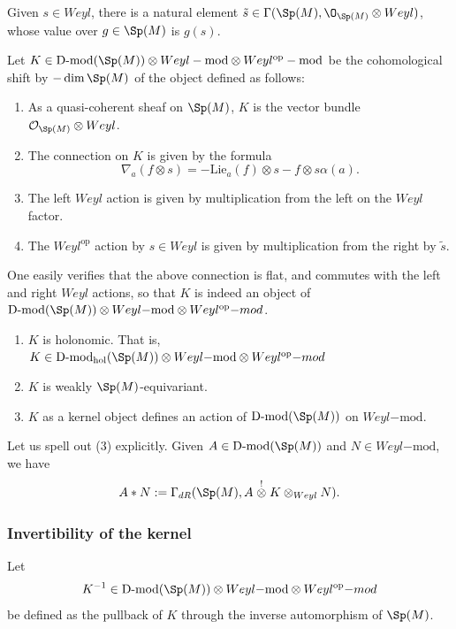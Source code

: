\documentclass[11pt]{article}
\begin{document}
Given $s\in Weyl$, there is a natural element $\tilde{s}\in \Gamma(\Sp(M), \O_{\Sp(M)}\otimes Weyl)$, whose value over $g\in \Sp(M)$ is $g(s)$.
\begin{definition}
    Let $K\in \operatorname{D-mod}(\Sp(M))\otimes Weyl-\mathrm{mod}\otimes Weyl^{\mathrm{op}}-\mathrm{mod}$ be the cohomological shift by $-\dim \Sp(M)$ of the object defined as follows:
    \begin{enumerate}
        \item As a quasi-coherent sheaf on $\Sp(M)$, $K$ is the vector bundle $\mathcal{O}_{\Sp(M)}\otimes Weyl$.
        \item The connection on $K$ is given by the formula $$\nabla_a(f\otimes s) = -\mathrm{Lie}_a(f)\otimes s - f\otimes s\alpha(a).$$
        \item The left $Weyl$ action is given by multiplication from the left on the $Weyl$ factor.
        \item The $Weyl^{\mathrm{op}}$ action by $s\in Weyl$ is given by multiplication from the right by $\tilde{s}$.
    \end{enumerate}
    One easily verifies that the above connection is flat, and commutes with the left and right $Weyl$ actions, so that $K$ is indeed an object of $\operatorname{D-mod}(\Sp(M))\otimes Weyl\mathrm{-mod}\otimes Weyl^{\mathrm{op}}{-mod}$.
\end{definition}
\begin{proposition}
    \begin{enumerate}
        \item $K$ is holonomic. That is, $K\in \operatorname{D-mod}_{\mathrm{hol}}(\Sp(M))\otimes Weyl\mathrm{-mod}\otimes Weyl^{\mathrm{op}}{-mod}$
        \item $K$ is weakly $\Sp(M)$-equivariant.
        \item $K$ as a kernel object defines an action of $\operatorname{D-mod}(\Sp(M))$ on $Weyl\mathrm{-mod}$.
    \end{enumerate}
\end{proposition}
Let us spell out (3) explicitly. Given $A\in \operatorname{D-mod}(\Sp(M))$ and $N\in Weyl\mathrm{-mod}$, we have
$$A * N := \Gamma_{dR}(\Sp(M), A\stackrel{!}{\otimes} K \otimes_{Weyl} N).$$

\subsubsection{Invertibility of the kernel}\label{sec: kernel invertibility}
Let $$K^{-1}\in\operatorname{D-mod}(\Sp(M))\otimes Weyl\mathrm{-mod}\otimes Weyl^{\mathrm{op}}{-mod}$$ be defined as the pullback of $K$ through the inverse automorphism of $\Sp(M)$.
\end{document}
